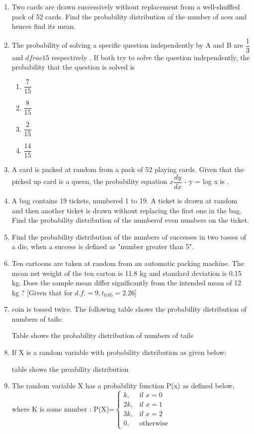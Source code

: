 \begin{enumerate}
\item Two cards are drawn successively without replacement from a well-shuffled pack of 52 cards. Find the probability distribution of the number of aces and hences find its mean.
\item The probability of solving a specific question independently by A and B are $\dfrac{1}{3}$ and $dfrac{1}{5}$ respectively . If both try to solve the question independently, the probability that the question is solved is 
\begin{enumerate}
\item $\dfrac{7}{15}$
\item $\dfrac{8}{15}$
\item $\dfrac{2}{15}$
\item $\dfrac{14}{15}$
\end{enumerate}
\item A card is packed at random from a pack of 52 playing cards. Given that the picked up card is a queen, the probability equation $x\dfrac{dy}{dx}$ - y = log x is \underline{\hspace{1cm}}.
\item A bag contains 19 tickets, numbered 1 to 19. A ticket is drawn at random and then another ticket is drawn without replacing the first one in the bag. Find the probability distribution of the numberof even numbers on the ticket.
\item Find the probability distribution of the numbers of successes in two tosses of a die, when a success is defined as "number greater than 5".
\item Ten cartoons are taken at random from an automatic packing machine. The mean net weight of the ten carton is 11.8 kg and standard deviation is 0.15 kg. Does the sample mean differ significantly from the intended mean of 12 kg ?
[Given that for $d.f. = 9,t_0.05 = 2.26$]\\
\item coin is tossed twice. The following table shows the probability distribution of numbers of tails:
\begin{table}[H]
\caption{Table shows the probability distribution of numbers of tails \label{tab:Number of tails}}

\end{table}
\item If X is a random variable with probability distribution as given below:
\begin{table}[H]
\caption{table shows the proability distribution \label{tab: probability distribution}}

\end{table}
\item The random variable X has a probability function P(x) as defined below, where K is some number :
	P(X)=$\begin{cases} k, & \text{if }  x=0 \\ 2k, & \text{if } x=1\\ 3k, & \text{if } x=2\\ 0, & \text{otherwise  } \end{cases}$
\end{enumerate}









